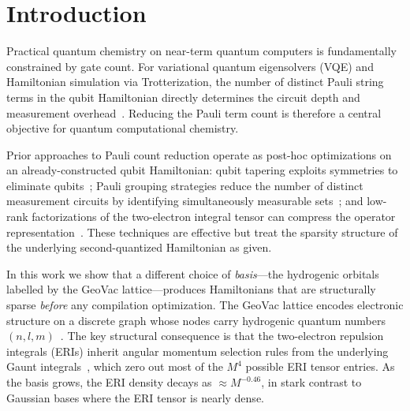 \documentclass[aps,pra,twocolumn,superscriptaddress,longbibliography]{revtex4-2}
\newcommand{\gvq}[2]{#2}
\begin{document}
\maketitle

\section{Introduction}
\label{sec:intro}

Practical quantum chemistry on near-term quantum computers is fundamentally
constrained by gate count.  For variational quantum eigensolvers (VQE) and
Hamiltonian simulation via Trotterization, the number of distinct Pauli
string terms in the qubit Hamiltonian directly determines the circuit depth
and measurement overhead~\cite{mcardle2020,cao2019}.  Reducing the Pauli
term count is therefore a central objective for quantum computational
chemistry.

Prior approaches to Pauli count reduction operate as post-hoc optimizations
on an already-constructed qubit Hamiltonian: qubit tapering exploits
symmetries to eliminate qubits~\cite{bravyi2017}; Pauli grouping strategies
reduce the number of distinct measurement circuits by identifying
simultaneously measurable sets~\cite{verteletskyi2020,yen2020}; and
low-rank factorizations of the two-electron integral tensor can compress
the operator representation~\cite{motta2021,lee2021}.  These techniques
are effective but treat the sparsity structure of the underlying
second-quantized Hamiltonian as given.

In this work we show that a different choice of \emph{basis}---the
hydrogenic orbitals labelled by the GeoVac lattice---produces
Hamiltonians that are structurally sparse \emph{before} any compilation
optimization.  The GeoVac lattice encodes electronic structure on a
discrete graph whose nodes carry hydrogenic quantum numbers
$(n, l, m)$~\cite{loutey_paper7,loutey_paper13}.  The key structural
consequence is that the two-electron repulsion integrals (ERIs) inherit
angular momentum selection rules from the underlying Gaunt
integrals~\cite{gaunt1929}, which zero out most of the $M^4$ possible
ERI tensor entries.  As the basis grows, the ERI density decays as
$\approx M^{\gvq{eri_decay_4pt}{-0.46}}$, in stark
contrast to Gaussian bases where the ERI tensor is nearly dense.
\end{document}
